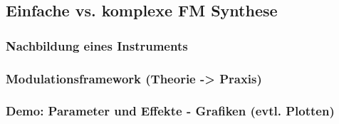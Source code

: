 \subsection{Einfache vs. komplexe FM Synthese}

\subsubsection{Nachbildung eines Instruments}
\subsubsection{Modulationsframework (Theorie -> Praxis)}
\subsubsection{Demo: Parameter und Effekte - Grafiken (evtl. Plotten)}